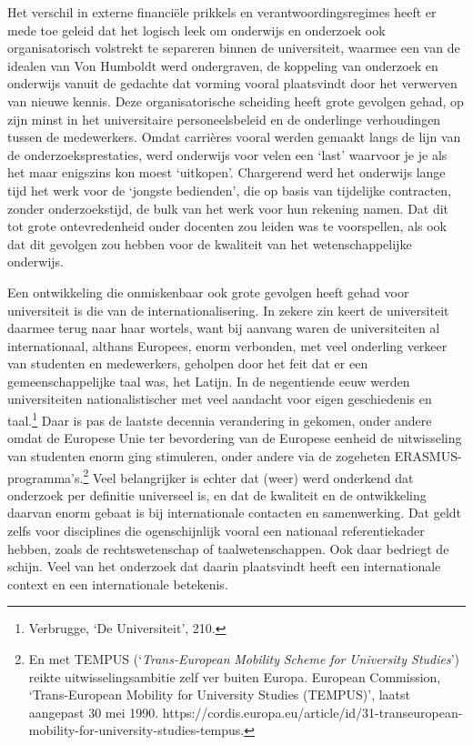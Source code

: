 \documentclass[smallauthor, chapterhaspagenum, nochapterinheader, pagenuminheader,  bigchapnum,medium2, tocpages, garamond, titleinheader]{jote-book}
\begin{document}
	Het verschil in externe financiële prikkels en verantwoordingsregimes heeft er mede toe geleid dat het logisch leek om onderwijs en onderzoek ook organisatorisch volstrekt te separeren binnen de universiteit, waarmee een van de idealen van Von Humboldt werd ondergraven, de koppeling van onderzoek en onderwijs vanuit de gedachte dat vorming vooral plaatsvindt door het verwerven van nieuwe kennis. Deze organisatorische scheiding heeft grote gevolgen gehad, op zijn minst in het universitaire personeelsbeleid en de onderlinge verhoudingen tussen de medewerkers. Omdat carrières vooral werden gemaakt langs de lijn van de onderzoeksprestaties, werd onderwijs voor velen een ‘last' waarvoor je je als het maar enigszins kon moest ‘uitkopen'. Chargerend werd het onderwijs lange tijd het werk voor de ‘jongste bedienden', die op basis van tijdelijke contracten, zonder onderzoekstijd, de bulk van het werk voor hun rekening namen. Dat dit tot grote ontevredenheid onder docenten zou leiden was te voorspellen, als ook dat dit gevolgen zou hebben voor de kwaliteit van het wetenschappelijke onderwijs.



	Een ontwikkeling die onmiskenbaar ook grote gevolgen heeft gehad voor universiteit is die van de internationalisering. In zekere zin keert de universiteit daarmee terug naar haar wortels, want bij aanvang waren de universiteiten al internationaal, althans Europees, enorm verbonden, met veel onderling verkeer van studenten en medewerkers, geholpen door het feit dat er een gemeenschappelijke taal was, het Latijn. In de negentiende eeuw werden universiteiten nationalistischer met veel aandacht voor eigen geschiedenis en taal.\footnote{Verbrugge, ‘De Universiteit', 210.} Daar is pas de laatste decennia verandering in gekomen, onder andere omdat de Europese Unie ter bevordering van de Europese eenheid de uitwisseling van studenten enorm ging stimuleren, onder andere via de zogeheten ERASMUS-programma's.\footnote{En met TEMPUS (‘\emph{Trans-European }\emph{Mobility}\emph{ }\emph{Scheme}\emph{ }\emph{for}\emph{ University Studies}') reikte uitwisselingsambitie zelf ver buiten Europa. European Commission, ‘Trans-European Mobility for University Studies (TEMPUS)', laatst aangepast 30 mei 1990. https://cordis.europa.eu/article/id/31-transeuropean-mobility-for-university-studies-tempus. } Veel belangrijker is echter dat (weer) werd onderkend dat onderzoek per definitie universeel is, en dat de kwaliteit en de ontwikkeling daarvan enorm gebaat is bij internationale contacten en samenwerking. Dat geldt zelfs voor disciplines die ogenschijnlijk vooral een nationaal referentiekader hebben, zoals de rechtswetenschap of taalwetenschappen. Ook daar bedriegt de schijn. Veel van het onderzoek dat daarin plaatsvindt heeft een internationale context en een internationale betekenis.
\end{document}
